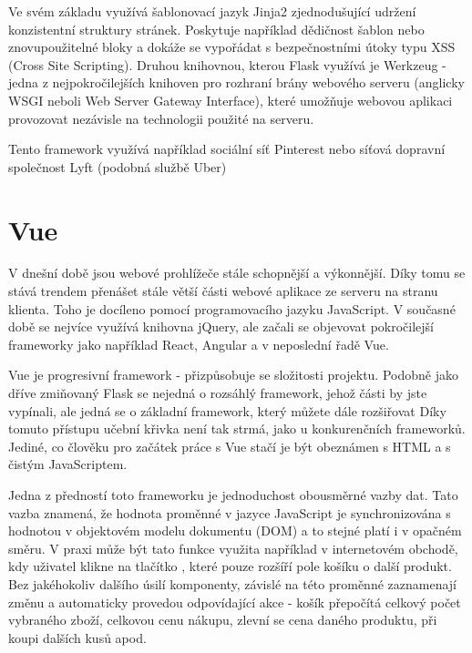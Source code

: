 Ve svém základu využívá šablonovací jazyk Jinja2 zjednodušující udržení konzistentní struktury stránek. Poskytuje například dědičnost šablon nebo znovupoužitelné bloky a dokáže se vypořádat s bezpečnostními útoky typu XSS (Cross Site Scripting). %
Druhou knihovnou, kterou Flask využívá je Werkzeug - jedna z nejpokročilejších knihoven pro rozhraní brány webového serveru (anglicky WSGI neboli Web Server Gateway Interface), které umožňuje webovou aplikaci provozovat nezávisle na technologii použité na serveru. %

Tento framework využívá například sociální síť Pinterest %
nebo síťová dopravní společnost Lyft %
(podobná službě Uber)

\section{Vue}
V dnešní době jsou webové prohlížeče stále schopnější a výkonnější. Díky tomu se stává trendem přenášet stále větší části webové aplikace ze serveru na stranu klienta. Toho je docíleno pomocí programovacího jazyku JavaScript. V současné době se nejvíce využívá knihovna jQuery, %
ale začali se objevovat pokročilejší frameworky jako například React, Angular a v neposlední řadě Vue.

Vue je progresivní framework - přizpůsobuje se složitosti projektu. Podobně jako dříve zmiňovaný Flask se nejedná o rozsáhlý framework, jehož části by jste vypínali, ale jedná se o základní framework, který můžete dále rozšiřovat %
Díky tomuto přístupu učební křivka není tak strmá, jako u konkurenčních frameworků. Jediné, co člověku pro začátek práce s Vue stačí je být obeznámen s HTML a s čistým JavaScriptem.  %

Jedna z předností toto frameworku je jednoduchost obousměrné vazby dat. Tato vazba znamená, že hodnota proměnné v jazyce JavaScript je synchronizována s hodnotou v objektovém modelu dokumentu (DOM) a to stejné platí i v opačném směru. %
V praxi může být tato funkce využita například v internetovém obchodě, kdy uživatel klikne na tlačítko , které pouze rozšíří pole košíku o další produkt. Bez jakéhokoliv dalšího úsilí komponenty, závislé na této proměnné zaznamenají změnu a automaticky provedou odpovídající akce - košík přepočítá celkový počet vybraného zboží, celkovou cenu nákupu, zlevní se cena daného produktu, při koupi dalších kusů apod. 

